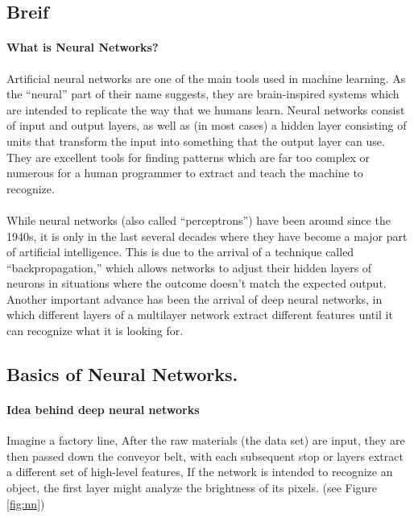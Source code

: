 
\subsection{Breif}
\paragraph{What is Neural Networks?}
Artificial neural networks are one of the main tools used in machine learning. As the “neural” part of their name suggests, they are brain-inspired systems which are intended to replicate the way that we humans learn. Neural networks consist of input and output layers, as well as (in most cases) a hidden layer consisting of units that transform the input into something that the output layer can use. They are excellent tools for finding patterns which are far too complex or numerous for a human programmer to extract and teach the machine to recognize.

\paragraph{}
While neural networks (also called “perceptrons”) have been around since the 1940s, it is only in the last several decades where they have become a major part of artificial intelligence. This is due to the arrival of a technique called “backpropagation,” which allows networks to adjust their hidden layers of neurons in situations where the outcome doesn’t match the expected output.\newline
Another important advance has been the arrival of deep neural networks, in which different layers of a multilayer network extract different features until it can recognize what it is looking for.

\subsection{Basics of Neural Networks.}
\paragraph{Idea behind deep neural networks}Imagine a factory line, After the raw materials (the data set) are input, they are then passed down the conveyor belt, with each subsequent stop or layers extract a different set of high-level features, If the network is intended to recognize an object, the first layer might analyze the brightness of its pixels. (see Figure \ref{fig:nn})
	
